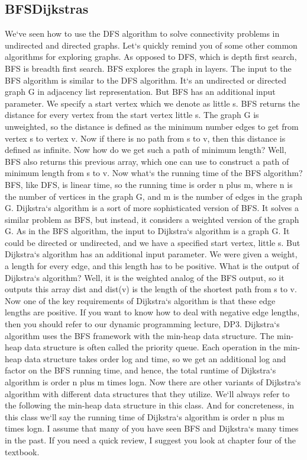 \subsection{BFSDijkstras}
We`ve seen how to use the DFS algorithm to solve connectivity problems in undirected and directed graphs.
Let`s quickly remind you of some other common algorithms for exploring graphs.
As opposed to DFS, which is depth first search, BFS is breadth first search.
BFS explores the graph in layers.
The input to the BFS algorithm is similar to the DFS algorithm.
It`s an undirected or directed graph G in adjacency list representation.
But BFS has an additional input parameter.
We specify a start vertex which we denote as little s.
BFS returns the distance for every vertex from the start vertex little s.
The graph G is unweighted, so the distance is defined as the minimum number edges to get from vertex s to vertex v.
Now if there is no path from s to v, then this distance is defined as infinite.
Now how do we get such a path of minimum length? Well, BFS also returns this previous array, which one can use to construct a path of minimum length from s to v.
Now what`s the running time of the BFS algorithm? BFS, like DFS, is linear time, so the running time is order n plus m, where n is the number of vertices in the graph G, and m is the number of edges in the graph G\@.
Dijkstra`s algorithm is a sort of more sophisticated version of BFS\@.
It solves a similar problem as BFS, but instead, it considers a weighted version of the graph G\@.
As in the BFS algorithm, the input to Dijkstra`s algorithm is a graph G\@.
It could be directed or undirected, and we have a specified start vertex, little s.
But Dijkstra`s algorithm has an additional input parameter.
We were given a weight, a length for every edge, and this length has to be positive.
What is the output of Dijkstra`s algorithm? Well, it is the weighted analog of the BFS output, so it outputs this array dist and dist(v) is the length of the shortest path from s to v.
Now one of the key requirements of Dijkstra`s algorithm is that these edge lengths are positive.
If you want to know how to deal with negative edge lengths, then you should refer to our dynamic programming lecture, DP3.
Dijkstra`s algorithm uses the BFS framework with the min-heap data structure.
The min-heap data structure is often called the priority queue.
Each operation in the min-heap data structure takes order log and time, so we get an additional log and factor on the BFS running time, and hence, the total runtime of Dijkstra`s algorithm is order n plus m times logn.
Now there are other variants of Dijkstra`s algorithm with different data structures that they utilize.
We`ll always refer to the following the min-heap data structure in this class.
And for concreteness, in this class we`ll say the running time of Dijkstra`s algorithm is order n plus m times logn.
I assume that many of you have seen BFS and Dijkstra`s many times in the past.
If you need a quick review, I suggest you look at chapter four of the textbook.

